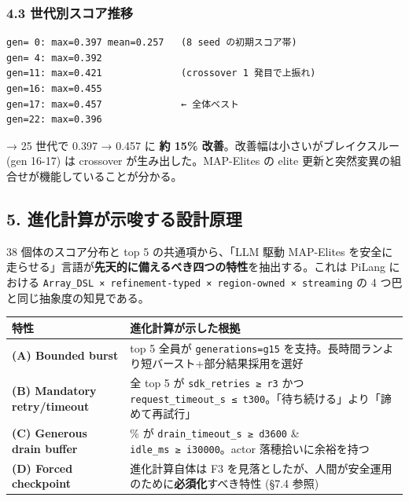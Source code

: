 \documentclass[
]{ltjsarticle}
\newcounter{none} %
\begin{document}
\subsubsection{4.3
世代別スコア推移}\label{ux4e16ux4ee3ux5225ux30b9ux30b3ux30a2ux63a8ux79fb}

\begin{verbatim}
gen= 0: max=0.397 mean=0.257   (8 seed の初期スコア帯)
gen= 4: max=0.392
gen=11: max=0.421              (crossover 1 発目で上振れ)
gen=16: max=0.455
gen=17: max=0.457              ← 全体ベスト
gen=22: max=0.396
\end{verbatim}

→ 25 世代で 0.397 → 0.457 に \textbf{約 15\%
改善}。改善幅は小さいがブレイクスルー (gen 16-17) は crossover
が生み出した。MAP-Elites の elite
更新と突然変異の組合せが機能していることが分かる。

\subsection{5.
進化計算が示唆する設計原理}\label{ux9032ux5316ux8a08ux7b97ux304cux793aux5506ux3059ux308bux8a2dux8a08ux539fux7406}

38 個体のスコア分布と top 5 の共通項から、「LLM 駆動 MAP-Elites
を安全に走らせる」言語が\textbf{先天的に備えるべき四つの特性}を抽出する。これは
PiLang における
\texttt{Array\_DSL\ ×\ refinement-typed\ ×\ region-owned\ ×\ streaming}
の 4 つ巴と同じ抽象度の知見である。

{\def\LTcaptype{none} %
\begin{longtable}[]{@{}
  >{\raggedright\arraybackslash}p{}
  >{\raggedright\arraybackslash}p{}@{}}
\toprule\noalign{}
\begin{minipage}[b]{\linewidth}\raggedright
特性
\end{minipage} & \begin{minipage}[b]{\linewidth}\raggedright
進化計算が示した根拠
\end{minipage} \\
\midrule\noalign{}
\endhead
\bottomrule\noalign{}
\endlastfoot
\textbf{(A) Bounded burst} & top 5 全員が \texttt{generations=g15}
を支持。長時間ランより短バースト+部分結果採用を選好 \\
\textbf{(B) Mandatory retry/timeout} & 全 top 5 が
\texttt{sdk\_retries\ ≥\ r3} かつ
\texttt{request\_timeout\_s\ ≤\ t300}。「待ち続ける」より「諦めて再試行」 \\
\textbf{(C) Generous drain buffer} & 80\% が
\texttt{drain\_timeout\_s\ ≥\ d3600} \&
\texttt{idle\_ms\ ≥\ i30000}。actor 落穂拾いに余裕を持つ \\
\textbf{(D) Forced checkpoint} & 進化計算自体は F3
を見落としたが、人間が安全運用のために\textbf{必須化}すべき特性 (§7.4
参照) \\
\end{longtable}
}
\end{document}
